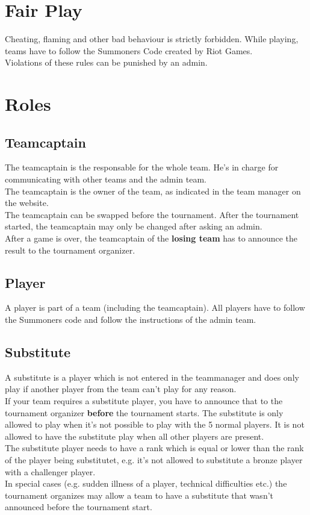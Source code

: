 \documentclass{article}
\begin{document}
\section{Fair Play}
Cheating, flaming and other bad behaviour is strictly forbidden. While playing, teams have to follow the Summoners Code created by Riot Games.
\\
Violations of these rules can be punished by an admin.

\section{Roles}
\subsection{Teamcaptain}
The teamcaptain is the responsable for the whole team. He's in charge for communicating with other teams and the admin team.
\\
The teamcaptain is the owner of the team, as indicated in the team manager on the website. 
\\
The teamcaptain can be swapped before the tournament. After the tournament started, the teamcaptain may only be changed after asking an admin.
\\
After a game is over, the teamcaptain of the \textbf{losing team} has to announce the result to the tournament organizer.

\subsection{Player}
A player is part of a team (including the teamcaptain). All players have to follow the Summoners code and follow the instructions of the admin team.

\subsection{Substitute}
A substitute is a player which is not entered in the teammanager and does only play if another player from the team can't play for any reason.
\\
If your team requires a substitute player, you have to announce that to the tournament organizer \textbf{before} the tournament starts. The substitute is only allowed to play when it's not possible to play with the 5 normal players. It is not allowed to have the substitute play when all other players are present.
\\
The substitute player needs to have a rank which is equal or lower than the rank of the player being substitutet, e.g. it's not allowed to substitute a bronze player with a challenger player.
\\
In special cases (e.g. sudden illness of a player, technical difficulties etc.) the tournament organizes may allow a team to have a substitute that wasn't announced before the tournament start.
\end{document}
